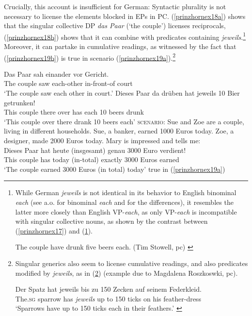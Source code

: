 \documentclass[output=paper]{langscibook}
\begin{document}
\z

Crucially, this account is insufficient for German: Syntactic plurality is not necessary to license the elements  blocked in EPs in PC. (\ref{prinzhornex18a}) shows that the singular collective DP  \textit{das Paar} (`the couple') licenses reciprocals,  (\ref{prinzhornex18b}) shows that it can combine with predicates containing \textit{jeweils}.\footnote{While German  \textit{jeweils} is not identical in its behavior to English binominal  \textit{each} (see \citealt{Stowell:2013} a.o. for binominal \textit{each} and \citealt{Zimmermann:2002} for the differences), it resembles the latter more closely than English VP-\textit{each}, as only VP-\textit{each} is incompatible with singular collective nouns, as shown by the contrast between (\ref{prinzhornex17}) and (\ref{prinzhornfnnex5}).

\ea    The couple have drunk five beers each. \hfill (Tim Stowell, pc)  \label{prinzhornfnnex5} \z} Moreover, it can partake in cumulative readings, as witnessed by the fact that (\ref{prinzhornex19b}) is true in scenario (\ref{prinzhornex19a}).\footnote{Singular generics also seem to license cumulative readings,  and also predicates modified by \textit{jeweils}, as in (\ref{prinzhornexfn45}) (example due to Magdalena Roszkoswki, pc).

\ea 
\gll Der Spatz hat jeweils bis zu 150 Zecken auf seinem Federkleid.\\
The.\textsc{sg} sparrow has \textit{jeweils} up to 150 ticks on his feather-dress\\
\glt `Sparrows have up to 150 ticks each in their feathers.'
\label{prinzhornexfn45} 
\z

}

\ea \label{prinzhornex18} 
\ea 
\gll Das Paar sah einander vor Gericht.\\
  The couple saw each-other in-front-of  court \\
\glt `The couple saw each other in court.' \label{prinzhornex18a}
\ex   \gll Dieses Paar da drüben hat jeweils 10 Bier getrunken! \\
  This couple there over has each 10 beers drunk\\
\glt `This couple over there drank 10 beers each'  \label{prinzhornex18b}
\ex  \textsc{scenario:} Sue and Zoe are a couple, living in different households. Sue, a banker, earned 1000 Euros today. Zoe, a designer, made 2000 Euros today. Mary is impressed and tells me: \label{prinzhornex19a}\\
\gll Dieses Paar hat heute (insgesamt) genau 3000 Euro verdient!\\
This couple has today (in-total) exactly 3000 Euros earned \\
\glt `The couple earned 3000 Euros (in total) today' \label{prinzhornex19b}\phantom{.}\hfill {true} in (\ref{prinzhornex19a})
\z\z
\end{document}
